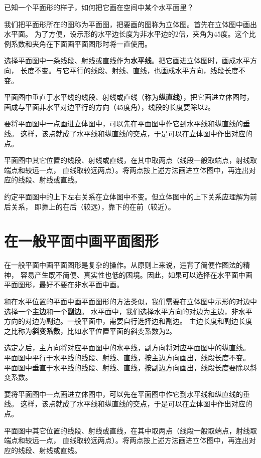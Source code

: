 \documentclass[12pt,UTF8]{ctexbook}
\begin{document}
\begin{appendix}
已知一个平面形的样子，如何把它画在空间中某个水平面里？

我们把平面形所在的图称为平面图，把要画的图称为立体图。首先在立体图中画出水平面。
为了方便，设示形的水平边长度为非水平边的$2$倍，夹角为$45$度。这个比例系数和夹角在下面画平面图形时将一直使用。

选择平面图中一条线段、射线或直线作为\textbf{水平线}。把它画进立体图时，画成水平方向，
长度不变。与它平行的线段、射线、直线，也画成水平方向，线段长度不变。

平面图中垂直于水平线的线段、射线或直线（称为\textbf{纵直线}），把它画进立体图时，
画成与平面非水平对边平行的方向（$45$度角），线段的长度要除以$2$。

要将平面图中一点画进立体图中，可以先在平面图中作它到水平线和纵直线的垂线。
这样，该点就成了水平线和纵直线的交点，于是可以在立体图中作出对应的点。

平面图中其它位置的线段、射线或直线，在其中取两点（线段一般取端点，射线取端点和较远一点，
直线取较远两点）。将两点按上述方法画进立体图中，再连出对应的线段、射线或直线。

约定平面图中的上下左右关系在立体图中不变。但立体图中的上下关系应理解为前后关系，
即靠上的在后（较远），靠下的在前（较近）。

\section{在一般平面中画平面图形}

在一般平面中画平面图形是复杂的操作。从原则上来说，违背了简便作图法的精神，
容易产生既不简便、真实性也低的困境。因此，如果可以选择在水平面中画平面图形，最好不要在非水平面中画。

和在水平位置的平面中画平面图形的方法类似，我们需要在立体图中示形的对边中选择一个\textbf{主边}和一个\textbf{副边}。
水平面中，我们选择水平方向的对边为主边，非水平方向的对边为副边。一般平面中，需要自行选择边和副边。
主边长度和副边长度之比称为\textbf{斜变系数}，比如水平位置平面的斜变系数为$2$。

选定之后，主方向将对应平面图中的水平线，副方向将对应平面图中的纵直线。
平面图中平行于水平线的线段、射线、直线，按主边方向画出，线段长度不变。
平面图中垂直于水平线的线段、射线、直线，按副边方向画出，线段长度要除以斜变系数。

要将平面图中一点画进立体图中，可以先在平面图中作它到水平线和纵直线的垂线。
这样，该点就成了水平线和纵直线的交点，于是可以在立体图中作出对应的点。

平面图中其它位置的线段、射线或直线，在其中取两点（线段一般取端点，射线取端点和较远一点，
直线取较远两点）。将两点按上述方法画进立体图中，再连出对应的线段、射线或直线。


\end{appendix}
\end{document}
